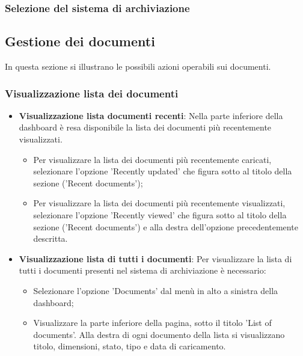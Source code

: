 \documentclass[10pt, a4paper]{article}
\begin{document}
\subsubsection{Selezione del sistema di archiviazione}

\subsection{Gestione dei documenti}
In questa sezione si illustrano le possibili azioni operabili sui documenti.
\subsubsection{Visualizzazione lista dei documenti}
\begin{itemize}
    \item \textbf{Visualizzazione lista documenti recenti}: Nella parte inferiore della dashboard è resa disponibile la lista dei documenti più recentemente visualizzati.
    \begin{itemize}
        \item Per visualizzare la lista dei documenti più recentemente caricati, selezionare l'opzione 'Recently updated' che figura sotto al titolo della sezione ('Recent documents');
        \item Per visualizzare la lista dei documenti più recentemente visualizzati, selezionare l'opzione 'Recently viewed' che figura sotto al titolo della sezione ('Recent documents') e alla destra dell'opzione precedentemente descritta.
    \end{itemize}
    \item \textbf{Visualizzazione lista di tutti i documenti}: Per visualizzare la lista di tutti i documenti presenti nel sistema di archiviazione è necessario:
    \begin{itemize}
        \item Selezionare l'opzione 'Documents' dal menù in alto a sinistra della dashboard;
        \item Visualizzare la parte inferiore della pagina, sotto il titolo 'List of documents'. Alla destra di ogni documento della lista si visualizzano titolo, dimensioni, stato, tipo e data di caricamento.
    \end{itemize}
\end{itemize}
\end{document}
